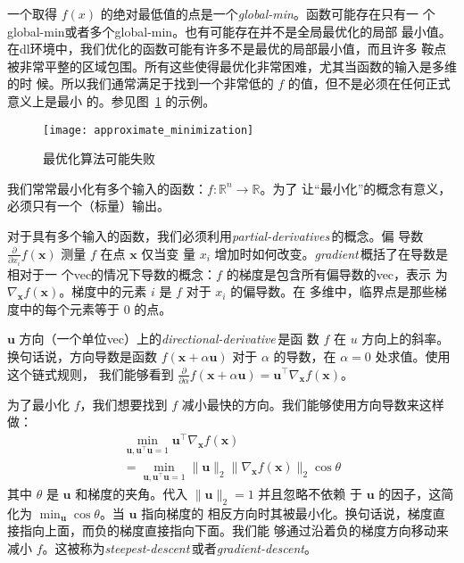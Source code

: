 一个取得 $f(x)$ 的绝对最低值的点是一个\emph{\gls{global-min}}。函数可能存在只有一
个\gls*{global-min}或者多个\gls*{global-min}。也有可能存在并不是全局最优化的局部
最小值。在\gls*{dl}环境中，我们优化的函数可能有许多不是最优的局部最小值，而且许多
鞍点被非常平整的区域包围。所有这些使得最优化非常困难，尤其当函数的输入是多维的时
候。所以我们通常满足于找到一个非常低的 $f$ 的值，但不是必须在任何正式意义上是最小
的。参见图~\ref{fig:approximate_minimization} 的示例。

\begin{figure}[h]
  \centering
  \texttt{[image: approximate\_minimization]}
  \caption{最优化算法可能失败\label{fig:approximate_minimization}}
\end{figure}

我们常常最小化有多个输入的函数：$f: \mathbb{R}^n \rightarrow \mathbb{R}$。为了
让``最小化''的概念有意义，必须只有一个（标量）输出。

对于具有多个输入的函数，我们必须利用\emph{\gls{partial-derivatives}}\,的概念。偏
导数 $\frac{\partial}{\partial x_i}f(\pmb{x})$ 测量 $f$ 在点 $\pmb{x}$ 仅当变
量 $x_i$ 增加时如何改变。\emph{\gls{gradient}}\,概括了在导数是相对于一
个\gls*{vec}的情况下导数的概念：$f$ 的梯度是包含所有偏导数的\gls*{vec}，表示
为 $\nabla_{\pmb{x}}f(\pmb{x})$。梯度中的元素 $i$ 是 $f$ 对于 $x_i$ 的偏导数。在
多维中，临界点是那些梯度中的每个元素等于 $0$ 的点。

$\pmb{u}$ 方向（一个单位\gls*{vec}）上的\emph{\gls{directional-derivative}}\,是函
数 $f$ 在 $u$ 方向上的斜率。换句话说，方向导数是函数 $f(\pmb{x} +
\alpha\pmb{u})$ 对于 $\alpha$ 的导数，在 $\alpha = 0$ 处求值。使用这个链式规则，
我们能够看到
$\frac{\partial}{\partial\alpha}f(\pmb{x} + \alpha\pmb{u}) =
\pmb{u}^{\top}\nabla_{\pmb{x}}f(\pmb{x})$。

为了最小化 $f$，我们想要找到 $f$ 减小最快的方向。我们能够使用方向导数来这样做：
\begin{gather}
  \min_{\pmb{u},\pmb{u}^{\top}\pmb{u}=1}\pmb{u}^{\top}\nabla_{\pmb{x}}f(\pmb{x})\\
  = \min_{\pmb{u},\pmb{u}^{\top}\pmb{u}=1}\|\pmb{u}\|_2\|\nabla_{\pmb{x}}f(\pmb{x})\|_2\cos\theta
\end{gather}
其中 $\theta$ 是 $\pmb{u}$ 和梯度的夹角。代入 $\|\pmb{u}\|_2 = 1$ 并且忽略不依赖
于 $\pmb{u}$ 的因子，这简化为 $\min_{\pmb{u}}\cos\theta$。当 $\pmb{u}$ 指向梯度的
相反方向时其被最小化。换句话说，梯度直接指向上面，而负的梯度直接指向下面。我们能
够通过沿着负的梯度方向移动来减小
$f$。这被称为\emph{\gls{steepest-descent}}\,或者\emph{\gls{gradient-descent}}。

